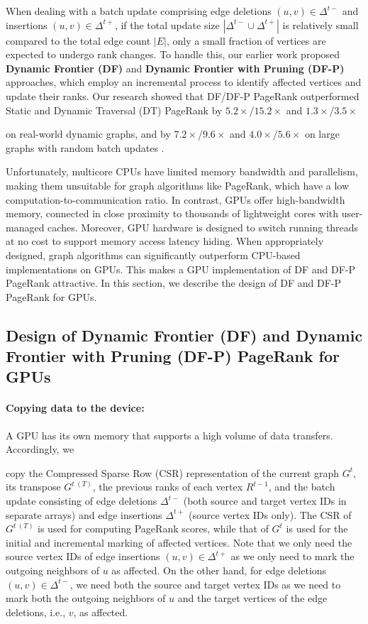 When dealing with a batch update comprising edge deletions $(u, v) \in \Delta^{t-}$ and insertions $(u, v) \in \Delta^{t+}$, if the total update size $|\Delta^{t-} \cup \Delta^{t+}|$ is relatively small compared to the total edge count $|E|$, only a small fraction of vertices are expected to undergo rank changes. To handle this, our earlier work proposed \textbf{Dynamic Frontier (DF)} and \textbf{Dynamic Frontier with Pruning (DF-P)} approaches, which employ an incremental process to identify affected vertices and update their ranks. Our research showed that DF/DF-P PageRank outperformed Static and Dynamic Traversal (DT) PageRank by $5.2\times$/$15.2\times$ and $1.3\times$/$3.5\times$ on real-world dynamic graphs, and by $7.2\times$/$9.6\times$ and $4.0\times$/$5.6\times$ on large graphs with random batch updates \cite{sahu2024df}.

Unfortunately, multicore CPUs have limited memory bandwidth and parallelism, making them unsuitable for graph algorithms like PageRank, which have a low computation-to-communication ratio. In contrast, GPUs offer high-bandwidth memory, connected in close proximity to thousands of lightweight cores with user-managed caches. Moreover, GPU hardware is designed to switch running threads at no cost to support memory access latency hiding. When appropriately designed, graph algorithms can significantly outperform CPU-based implementations on GPUs. This makes a GPU implementation of DF and DF-P PageRank attractive. In this section, we describe the design of DF and DF-P PageRank for GPUs.



\subsection{Design of Dynamic Frontier (DF) and Dynamic Frontier with Pruning (DF-P) PageRank for GPUs}
\label{sec:frontier}

\paragraph{Copying data to the device:}

A GPU has its own memory that supports a high volume of data transfers. Accordingly, we copy the Compressed Sparse Row (CSR) representation of the current graph $G^t$, its transpose $G^{t\ (T)}$, the previous ranks of each vertex $R^{t-1}$, and the batch update consisting of edge deletions $\Delta^{t-}$ (both source and target vertex IDs in separate arrays) and edge insertions $\Delta^{t+}$ (source vertex IDs only). The CSR of $G^{t\ (T)}$ is used for computing PageRank scores, while that of $G^t$ is used for the initial and incremental marking of affected vertices. Note that we only need the source vertex IDs of edge insertions $(u, v) \in \Delta^{t+}$ as we only need to mark the outgoing neighbors of $u$ as affected. On the other hand, for edge deletions $(u, v) \in \Delta^{t-}$, we need both the source and target vertex IDs as we need to mark both the outgoing neighbors of $u$ and the target vertices of the edge deletions, i.e., $v$, as affected.

